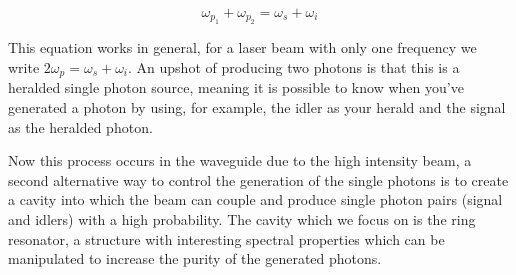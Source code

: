 \begin{equation} \label{energyConservation}
\omega_{p_1}+\omega_{p_2}=\omega_s+\omega_i
\end{equation}

This equation works in general, for a laser beam with only one frequency we write $2\omega_p=\omega_s+\omega_i$. An upshot of producing two photons is that this is a heralded single photon source, meaning it is possible to know when you've generated a photon by using, for example, the idler as your herald and the signal as the heralded photon. 

Now this process occurs in the waveguide due to the high intensity beam, a second alternative way to control the generation of the single photons is to create a cavity into which the beam can couple and produce single photon pairs (signal and idlers) with a high probability. The cavity which we focus on is the ring resonator, a structure with interesting spectral properties which can be manipulated to increase the purity of the generated photons. 





